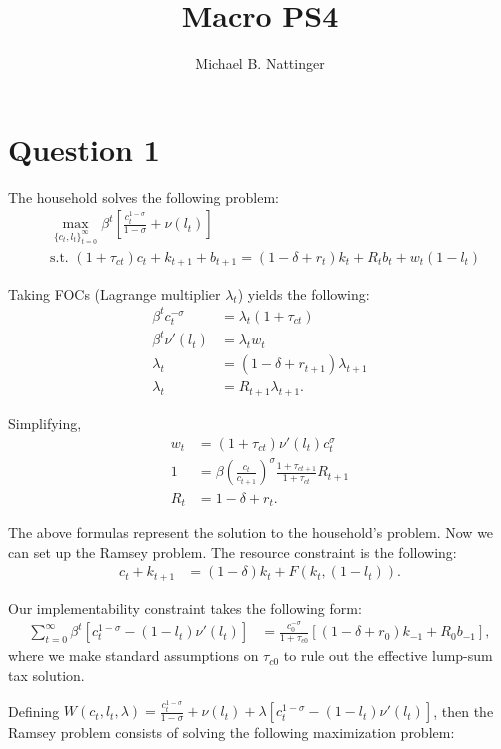 \documentclass[11pt]{article} %
\title{Macro PS4}
\author{Michael B. Nattinger}
\begin{document}
\maketitle
\section{Question 1}
The household solves the following problem:
\begin{align*}
&\max_{\{ c_t,l_t \}_{t=0}^{\infty}} \beta^t\left[ \frac{c_t^{1-\sigma}}{1-\sigma} + \nu(l_t) \right] \\
&\text{s.t. } (1+\tau_{ct})c_t +k_{t+1} + b_{t+1} = (1-\delta + r_t)k_t + R_tb_t +w_t(1-l_t)
\end{align*}

Taking FOCs (Lagrange multiplier $\lambda_t$) yields the following:
\begin{align*}
\beta^t c_t^{-\sigma} &= \lambda_t(1+\tau_{ct})\\
\beta^t \nu'(l_t) &=  \lambda_t w_t\\
\lambda_t &=  (1-\delta + r_{t+1}) \lambda_{t+1} \\
\lambda_t &=  R_{t+1}\lambda_{t+1}.
\end{align*}

Simplifying,
\begin{align*}
w_t &= (1+\tau_{ct})\nu'(l_t)c_t^{\sigma} \\
1&=\beta\left(\frac{c_t}{c_{t+1}}\right)^{\sigma}\frac{1+\tau_{ct+1}}{1+\tau_{ct}}R_{t+1}\\
R_{t} &= 1-\delta + r_t.
\end{align*}

The above formulas represent the solution to the household's problem. Now we can set up the Ramsey problem. The resource constraint is the following:
\begin{align*}
c_t + k_{t+1} &= (1-\delta)k_t + F(k_t,(1-l_t)).
\end{align*}

Our implementability constraint takes the following form:
\begin{align*}
\sum_{t=0}^{\infty}\beta^t [c_t^{1-\sigma} - (1-l_t)\nu'(l_t) ] &= \frac{c_0^{-\sigma}}{1+\tau_{c0}}[(1-\delta + r_0)k_{-1} + R_0b_{-1}],
\end{align*}
where we make standard assumptions on $\tau_{c0}$ to rule out the effective lump-sum tax solution.

Defining $W(c_t,l_t,\lambda) =  \frac{c_t^{1-\sigma}}{1-\sigma} + \nu(l_t) + \lambda[c_t^{1-\sigma} - (1-l_t)\nu'(l_t)] $, then the Ramsey problem consists of solving the following maximization problem:
\end{document}
